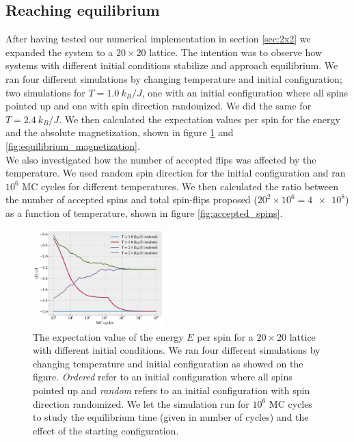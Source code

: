 \documentclass[%
 reprint,
nofootinbib,
aps,
]{revtex4-1}
\begin{document}
\newpage
\twocolumngrid



\subsection{Reaching equilibrium}
After having tested our numerical implementation in section \ref{sec:2x2} we expanded the system to a $20 \times 20$ lattice. The intention was to observe how systems with different initial conditions stabilize and approach equilibrium. We ran four different simulations by changing temperature and initial configuration; two simulations for $T = 1.0 \ k_B/J$, one with an initial configuration where all spins pointed up and one with spin direction randomized. We did the same for $T = 2.4 \ k_B/J$. We then calculated the expectation values per spin for the energy and the absolute magnetization, shown in figure \ref{fig:equilibrium_energy} and \ref{fig:equilibrium_magnetization}.\\
We also investigated how the number of accepted flips was affected by the temperature. We used random spin direction for the initial configuration and ran $10^6$ MC cycles for different temperatures. We then calculated the ratio between the number of accepted spins and total spin-flips proposed ($20^2 \times 10^6 = \num{4e8}$) as a function of temperature, shown in figure \ref{fig:accepted_spins}.
\hfill \linebreak
\hfill \linebreak
\hfill \linebreak
\hfill \linebreak
\hfill \linebreak
\hfill \linebreak

 \begin{figure}[H]  
  \centering
  \includegraphics[width=0.45\textwidth]{figures/equilibrium_energy.pdf}
  \caption{The expectation value of the energy $E$ per spin for a $20\times20$ lattice with different initial conditions. We ran four different simulations by changing temperature and initial configuration as showed on the figure. \textit{Ordered} refer to an initial configuration where all spins pointed up and \textit{random} refers to an initial configuration with spin direction randomized. We let the simulation run for $10^6$ MC cycles to study the equilibrium time (given in number of cycles) and the effect of the starting configuration.}
  \label{fig:equilibrium_energy}
\end{figure}
\end{document}
